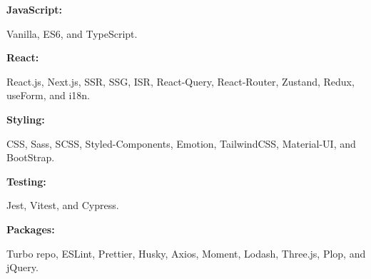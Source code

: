 \documentclass[8pt]{developercv} %
\begin{document}
    \begin{minipage}[t]{0.47\textwidth}
        \vspace{-6pt}

        \begin{minipage}[t]{0.2\textwidth}
            \textbf{JavaScript:}
        \end{minipage}
        \hfill
        \begin{minipage}[t]{0.73\textwidth}
            Vanilla, ES6, and TypeScript.
        \end{minipage}
        \vspace{4pt}

        \begin{minipage}[t]{0.2\textwidth}
            \textbf{React:}
        \end{minipage}
        \hfill
        \begin{minipage}[t]{0.73\textwidth}
            React.js, Next.js, SSR, SSG, ISR, React-Query, React-Router, Zustand, Redux, useForm, and i18n.
        \end{minipage}
        \vspace{4pt}

        \begin{minipage}[t]{0.2\textwidth}
            \textbf{Styling:}
        \end{minipage}
        \hfill
        \begin{minipage}[t]{0.73\textwidth}
            CSS, Sass, SCSS, Styled-Components, Emotion, TailwindCSS, Material-UI, and BootStrap.
        \end{minipage}
        \vspace{4pt}

        \begin{minipage}[t]{0.2\textwidth}
            \textbf{Testing:}
        \end{minipage}
        \hfill
        \begin{minipage}[t]{0.73\textwidth}
            Jest, Vitest, and Cypress.
        \end{minipage}
        \vspace{4pt}

        \begin{minipage}[t]{0.2\textwidth}
            \textbf{Packages:}
        \end{minipage}
        \hfill
        \begin{minipage}[t]{0.73\textwidth}
            Turbo repo, ESLint, Prettier, Husky, Axios, Moment, Lodash, Three.js, Plop, and jQuery.
        \end{minipage}
        \vspace{4pt}


\end{minipage}
\end{document}
